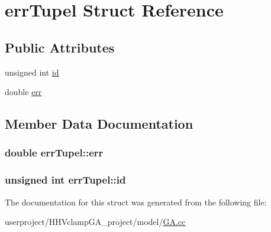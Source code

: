 \hypertarget{structerrTupel}{\section{err\+Tupel Struct Reference}
\label{structerrTupel}
}
\subsection*{Public Attributes}
\begin{DoxyCompactItemize}
\item 
unsigned int \hyperlink{structerrTupel_a935755253156aeeda51214ef673690d0}{id}
\item 
double \hyperlink{structerrTupel_a99cafdc91eea024efa6fa2c501d7ff75}{err}
\end{DoxyCompactItemize}


\subsection{Member Data Documentation}
\hypertarget{structerrTupel_a99cafdc91eea024efa6fa2c501d7ff75}{
\subsubsection[{err}]{\setlength{\rightskip}{0pt plus 5cm}double err\+Tupel\+::err}}\label{structerrTupel_a99cafdc91eea024efa6fa2c501d7ff75}
\hypertarget{structerrTupel_a935755253156aeeda51214ef673690d0}{
\subsubsection[{id}]{\setlength{\rightskip}{0pt plus 5cm}unsigned int err\+Tupel\+::id}}\label{structerrTupel_a935755253156aeeda51214ef673690d0}


The documentation for this struct was generated from the following file\+:\begin{DoxyCompactItemize}
\item 
userproject/\+H\+H\+Vclamp\+G\+A\+\_\+project/model/\hyperlink{GA_8cc}{G\+A.\+cc}\end{DoxyCompactItemize}
